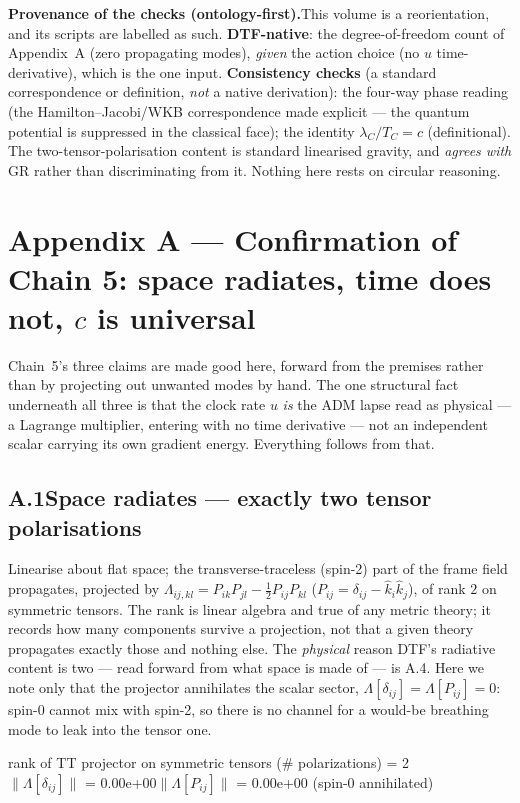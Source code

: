 \documentclass[11pt]{article}
\begin{document}
\begin{tcolorbox}
\textbf{Provenance of the checks (ontology-first).}\enspace This volume is a reorientation, and its
scripts are labelled as such. \textbf{DTF-native}: the degree-of-freedom count of Appendix~A (zero
propagating modes), \emph{given} the action choice (no $u$ time-derivative), which is the one input.
\textbf{Consistency checks} (a standard correspondence or definition, \emph{not} a native derivation):
the four-way phase reading (the Hamilton--Jacobi/WKB correspondence made explicit --- the quantum
potential is suppressed in the classical face); the identity $\lambda_C/T_C=c$ (definitional). The
two-tensor-polarisation content is standard linearised gravity, and \emph{agrees with} GR rather than
discriminating from it. Nothing here rests on circular reasoning.
\end{tcolorbox}

\clearpage
\appendix
\section*{Appendix A --- Confirmation of Chain 5: space radiates, time does not, $c$ is universal}

\noindent Chain~5's three claims are made good here, forward from the premises rather than by projecting
out unwanted modes by hand. The one structural fact underneath all three is that the clock rate $u$
\emph{is} the ADM lapse read as physical --- a Lagrange multiplier, entering with no time derivative --- not
an independent scalar carrying its own gradient energy. Everything follows from that.

\subsection*{A.1\quad Space radiates --- exactly two tensor polarisations}
Linearise about flat space; the transverse-traceless (spin-2) part of the frame field propagates, projected
by $\Lambda_{ij,kl}=P_{ik}P_{jl}-\tfrac12P_{ij}P_{kl}$ ($P_{ij}=\delta_{ij}-\hat k_i\hat k_j$), of rank $2$
on symmetric tensors. The rank is linear algebra and true of any metric theory; it records how many
components survive a projection, not that a given theory propagates exactly those and nothing else. The
\emph{physical} reason DTF's radiative content is two --- read forward from what space is made of --- is
A.4. Here we note only that the projector annihilates the scalar sector, $\Lambda[\delta_{ij}]=\Lambda[P_{ij}]=0$:
spin-0 cannot mix with spin-2, so there is no channel for a would-be breathing mode to leak into the tensor one.
\begin{tcolorbox}[colback=cbPyBg,colframe=cbNodeFr,boxrule=0.5pt,arc=2pt,left=8pt,right=8pt,top=4pt,bottom=4pt]
\ttfamily\small rank of TT projector on symmetric tensors (\# polarizations) = 2\\
$\|\Lambda[\delta_{ij}]\|$ = 0.00e+00\qquad$\|\Lambda[P_{ij}]\|$ = 0.00e+00  (spin-0 annihilated)
\end{tcolorbox}
\end{document}
